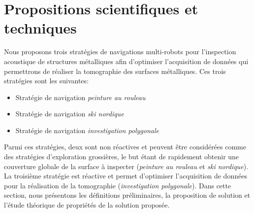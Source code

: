 \documentclass[francais,RandD]{rapportPFE}
\begin{document}


	\section{Propositions scientifiques et techniques}
		Nous proposons trois stratégies de navigations multi-robots pour l'inspection acoustique de structures métalliques afin d'optimiser l'acquisition de données qui permettrons de réaliser la tomographie des surfaces métalliques. Ces trois stratégies sont les suivantes:
		\begin{itemize}
			\item Stratégie de navigation \textit{peinture au rouleau}
			\item Stratégie de navigation \textit{ski nordique}
			\item Stratégie de navigation \textit{investigation polygonale}
		\end{itemize}
		Parmi ces stratégies, deux sont non réactives et peuvent être considérées comme des stratégies d'exploration grossières, le but étant de rapidement obtenir une couverture globale de la surface à inspecter (\textit{peinture au rouleau} et \textit{ski nordique}).
		La troisième stratégie est réactive et permet d'optimiser l'acquisition de données pour la réalisation de la tomographie (\textit{investigation polygonale}).
		Dans cette section, nous présentons les définitions préliminaires, la proposition de solution et l'étude théorique de propriétés de la solution proposée.
\end{document}
